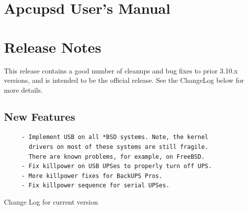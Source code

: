 
\section*{Apcupsd User's Manual}
\label{_ChapterStart}

\label{Release-Notes}

\section*{Release Notes}

\label{index-Release-Notes-1}
This release contains a good number of cleanups and bug fixes to prior 3.10.x
versions, and is intended to be the official release. See the ChangeLog below
for more details. 

\label{New-Features}

\subsection*{New Features}

\label{index-New-Features-2}

\footnotesize
\begin{verbatim}
     - Implement USB on all *BSD systems. Note, the kernel
       drivers on most of these systems are still fragile.
       There are known problems, for example, on FreeBSD.
     - Fix killpower on USB UPSes to properly turn off UPS.
     - More killpower fixes for BackUPS Pros.
     - Fix killpower sequence for serial UPSes.
\end{verbatim}
\normalsize

Change Log for current version 

